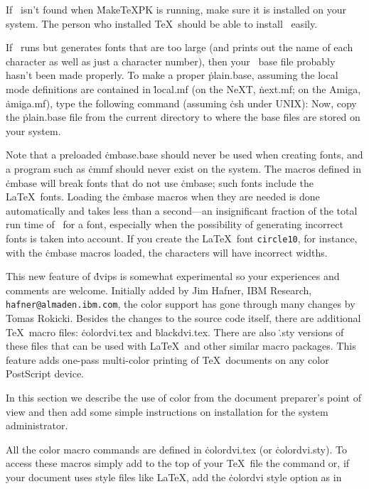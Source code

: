If \MF\ isn't found when \.{MakeTeXPK} is running, make sure it is installed
on your system.  The person who installed \TeX\ should be able to install
\MF\ easily.

If \MF\ runs but generates fonts that are too large (and prints out the
name of each character as well as just a character number), then your
\MF\ base file probably hasn't been made properly.  To make a proper
\.{plain.base}, assuming the local mode definitions are contained in
\.{local.mf} (on the NeXT, \.{next.mf}; on the Amiga, \.{amiga.mf}),
type the following command (assuming \.{csh} under UNIX):
\noindent
Now, copy the \.{plain.base} file from the current directory to where
the base files are stored on your system.

Note that a preloaded \.{cmbase.base} should never be used when creating
fonts, and a program such as \.{cmmf} should never exist on the system.
The macros defined in \.{cmbase} will break fonts that do not use
\.{cmbase}; such fonts include the La\TeX\ fonts.  Loading the \.{cmbase}
macros when they are needed is done automatically and takes less than a
second---an insignificant fraction of the total run time of \MF\ for a
font, especially when the possibility of generating incorrect fonts is
taken into account.  If you create the La\TeX\ font {\tt circle10},
for instance, with the \.{cmbase} macros loaded, the characters will
have incorrect widths.


This new feature of \.{dvips} is somewhat experimental so your
experiences and comments are welcome.  Initially added by Jim Hafner,
IBM Research, {\tt hafner@almaden.ibm.com}, the color support has
gone through many changes by Tomas Rokicki.  Besides the changes to the
source code itself, there are additional
\TeX\ macro files: \.{colordvi.tex} and \.{blackdvi.tex}.  There are also
\.{.sty} versions of these files that can be used with La\TeX\ and
other similar macro packages.  This feature adds one-pass multi-color
printing of \TeX\ documents on any color PostScript device.

In this section we describe the use of color from the document
preparer's point of view and then add some simple instructions on
installation for the system administrator.


All the color macro commands are defined in \.{colordvi.tex} (or
\.{colordvi.sty}).  To access these macros simply add to the top of your
\TeX\ file the command
\noindent
or, if your document uses style files like La\TeX, add the \.{colordvi}
style option as in

